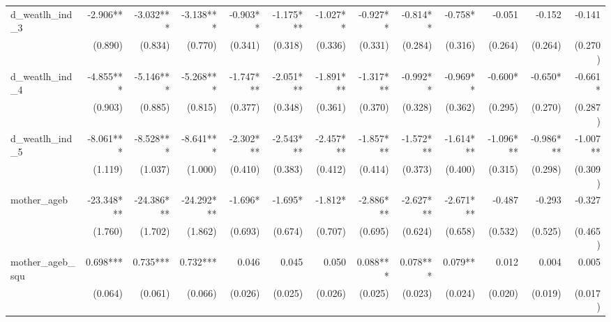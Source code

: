 \begin{tabular}{lrrrrrrrrrrrr}
d\_weatlh\_ind\_3                           &     -2.906** &    -3.032*** &    -3.138*** &     -0.903** &    -1.175*** &     -1.027** &     -0.927** &     -0.814** &      -0.758* &       -0.051 &       -0.152 &       -0.141 \\ 
                                            &      (0.890) &      (0.834) &      (0.770) &      (0.341) &      (0.318) &      (0.336) &      (0.331) &      (0.284) &      (0.316) &      (0.264) &      (0.264) &      (0.270) \\ 
d\_weatlh\_ind\_4                           &    -4.855*** &    -5.146*** &    -5.268*** &    -1.747*** &    -2.051*** &    -1.891*** &    -1.317*** &     -0.992** &     -0.969** &      -0.600* &      -0.650* &      -0.661* \\ 
                                            &      (0.903) &      (0.885) &      (0.815) &      (0.377) &      (0.348) &      (0.361) &      (0.370) &      (0.328) &      (0.362) &      (0.295) &      (0.270) &      (0.287) \\ 
d\_weatlh\_ind\_5                           &    -8.061*** &    -8.528*** &    -8.641*** &    -2.302*** &    -2.543*** &    -2.457*** &    -1.857*** &    -1.572*** &    -1.614*** &    -1.096*** &    -0.986*** &     -1.007** \\ 
                                            &      (1.119) &      (1.037) &      (1.000) &      (0.410) &      (0.383) &      (0.412) &      (0.414) &      (0.373) &      (0.400) &      (0.315) &      (0.298) &      (0.309) \\ 
mother\_ageb                                &   -23.348*** &   -24.386*** &   -24.292*** &      -1.696* &      -1.695* &      -1.812* &    -2.886*** &    -2.627*** &    -2.671*** &       -0.487 &       -0.293 &       -0.327 \\ 
                                            &      (1.760) &      (1.702) &      (1.862) &      (0.693) &      (0.674) &      (0.707) &      (0.695) &      (0.624) &      (0.658) &      (0.532) &      (0.525) &      (0.465) \\ 
mother\_ageb\_squ                           &     0.698*** &     0.735*** &     0.732*** &        0.046 &        0.045 &        0.050 &     0.088*** &     0.078*** &      0.079** &        0.012 &        0.004 &        0.005 \\ 
                                            &      (0.064) &      (0.061) &      (0.066) &      (0.026) &      (0.025) &      (0.026) &      (0.025) &      (0.023) &      (0.024) &      (0.020) &      (0.019) &      (0.017) \\ 

\end{tabular}
